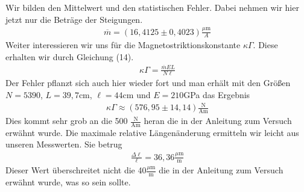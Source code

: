\documentclass[a4paper, 12pt]{scrartcl}
\begin{document}
Wir bilden den Mittelwert und den statistischen Fehler. Dabei nehmen wir hier jetzt nur die Beträge der Steigungen.  
\begin{align*}
\overline{m} = (16,4125 \pm 0,4023)\frac{\mu\textrm{m}}{A}
\end{align*}
Weiter interessieren wir uns für die Magnetostriktionskonstante $\kappa \Gamma$. Diese erhalten wir durch Gleichung (14). 
\begin{align*}
\kappa \Gamma = \frac{\overline{m}EL}{N \ell}
\end{align*}
Der Fehler pflanzt sich auch hier wieder fort und man erhält mit den Größen $N=5390$, $L=39,7$cm, $\ell = 44$cm und $E=210$GPa das Ergebnis 
\begin{align*}
\kappa \Gamma \approx ( 576,95 \pm 14,14 ) \frac{\textrm{N}}{\textrm{Am}} 
\end{align*}
Dies kommt sehr grob an die 500 $\frac{\textrm{N}}{\textrm{Am}}$ heran die in der Anleitung zum Versuch erwähnt wurde. Die maximale relative Längenänderung ermitteln wir leicht aus unseren Messwerten. Sie betrug 
\begin{align*}
\frac{\Delta \ell}{\ell} = 36,36 \frac{\mu \textrm{m}}{\textrm{m}}
\end{align*}
Dieser Wert überschreitet nicht die 40$\frac{\mu \textrm{m}}{\textrm{m}}$ die in der Anleitung zum Versuch erwähnt wurde, was so sein sollte. 


\newpage
\end{document}
